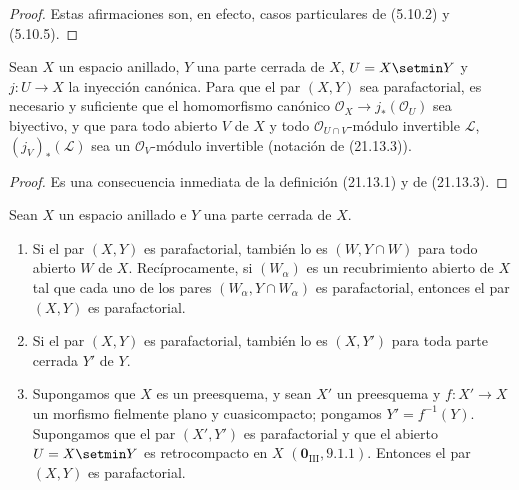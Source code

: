 \begin{proof}
Estas afirmaciones son, en efecto, casos particulares de (5.10.2) y (5.10.5).
\end{proof}

\begin{proposition}[21.13.5]
\label{IV.21.13.5}
Sean $X$ un espacio anillado, $Y$ una parte cerrada de $X$, $U=X\setmin Y$ y
$j:U\to X$ la inyección canónica. Para que el par $(X,Y)$ sea parafactorial, es
necesario y suficiente que el homomorfismo canónico $\mathcal O_X\to j_*(\mathcal O_U)$
sea biyectivo, y que para todo abierto $V$ de $X$ y todo
$\mathcal O_{U\cap V}$-módulo invertible $\mathscr L$, $(j_V)_*(\mathscr L)$ sea un
$\mathcal O_V$-módulo invertible (notación de \textup{(21.13.3))}.
\end{proposition}

\begin{proof}
Es una consecuencia inmediata de la definición (21.13.1) y de (21.13.3).
\end{proof}

\begin{corollary}[21.13.6]
\label{IV.21.13.6}
Sean $X$ un espacio anillado e $Y$ una parte cerrada de $X$.
\begin{enumerate}[label=\textup{(\roman*)}]
  \item Si el par $(X,Y)$ es parafactorial, también lo es
  $(W,Y\cap W)$ para todo abierto $W$ de $X$. Recíprocamente, si $(W_\alpha)$ es un
  recubrimiento abierto de $X$ tal que cada uno de los pares
  $(W_\alpha,Y\cap W_\alpha)$ es parafactorial, entonces el par $(X,Y)$ es
  parafactorial.
  \item Si el par $(X,Y)$ es parafactorial, también lo es $(X,Y')$ para
  toda parte cerrada $Y'$ de $Y$.
  \item Supongamos que $X$ es un preesquema, y sean $X'$ un preesquema y
  $f:X'\to X$ un morfismo fielmente plano y cuasicompacto; pongamos
  $Y'=f^{-1}(Y)$. Supongamos que el par $(X',Y')$ es parafactorial y que
  el abierto $U=X\setmin Y$ es retrocompacto en $X$ $(\mathbf 0_{\mathrm{III}}, 9.1.1)$.
  Entonces el par $(X,Y)$ es parafactorial.
\end{enumerate}
\end{corollary}

